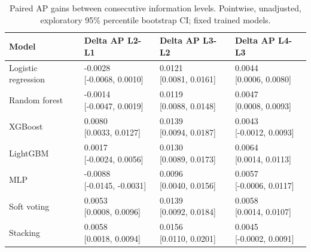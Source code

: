 \begin{table}[htbp]
\centering
\small
\caption{Paired AP gains between consecutive information levels. Pointwise, unadjusted, exploratory 95\% percentile bootstrap CI; fixed trained models.}
\label{tab:rq2-sequential-gains}
\begin{tabular}{llll}
\toprule
Model & Delta AP L2-L1 & Delta AP L3-L2 & Delta AP L4-L3 \\
\midrule
Logistic regression & \shortstack{{-0.0028} \\ {[-0.0068, 0.0010]}} & \shortstack{{0.0121} \\ {[0.0081, 0.0161]}} & \shortstack{{0.0044} \\ {[0.0006, 0.0080]}} \\
Random forest & \shortstack{{-0.0014} \\ {[-0.0047, 0.0019]}} & \shortstack{{0.0119} \\ {[0.0088, 0.0148]}} & \shortstack{{0.0047} \\ {[0.0008, 0.0093]}} \\
XGBoost & \shortstack{{0.0080} \\ {[0.0033, 0.0127]}} & \shortstack{{0.0139} \\ {[0.0094, 0.0187]}} & \shortstack{{0.0043} \\ {[-0.0012, 0.0093]}} \\
LightGBM & \shortstack{{0.0017} \\ {[-0.0024, 0.0056]}} & \shortstack{{0.0130} \\ {[0.0089, 0.0173]}} & \shortstack{{0.0064} \\ {[0.0014, 0.0113]}} \\
MLP & \shortstack{{-0.0088} \\ {[-0.0145, -0.0031]}} & \shortstack{{0.0096} \\ {[0.0040, 0.0156]}} & \shortstack{{0.0057} \\ {[-0.0006, 0.0117]}} \\
Soft voting & \shortstack{{0.0053} \\ {[0.0008, 0.0096]}} & \shortstack{{0.0139} \\ {[0.0092, 0.0184]}} & \shortstack{{0.0058} \\ {[0.0014, 0.0107]}} \\
Stacking & \shortstack{{0.0058} \\ {[0.0018, 0.0094]}} & \shortstack{{0.0156} \\ {[0.0110, 0.0201]}} & \shortstack{{0.0045} \\ {[-0.0002, 0.0091]}} \\
\bottomrule
\end{tabular}
\end{table}
